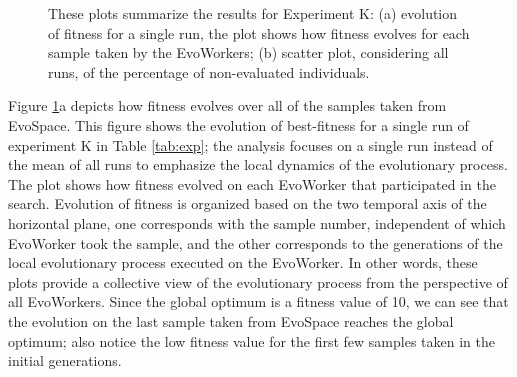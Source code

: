 \begin{figure}[t]
    \centering
    \caption{
    These plots summarize the results for Experiment K:
    (a) evolution of fitness for a single run, the plot shows how fitness evolves for each sample taken by the EvoWorkers;
    (b) scatter plot, considering all runs, of the percentage of non-evaluated individuals.}
    \label{fig:others}
\end{figure}

Figure \ref{fig:others}a depicts how fitness evolves over all of the samples taken from EvoSpace.
This figure shows the evolution of best-fitness for a single run of experiment K in Table \ref{tab:exp};
the analysis focuses on a single run instead of the mean of all runs to emphasize the local dynamics of the evolutionary process.
The plot shows how fitness evolved on each EvoWorker that participated in the search.
Evolution of fitness is organized based on the two temporal axis of the horizontal plane,
one corresponds with the sample number, independent of which EvoWorker took the sample, and the other corresponds
to the generations of the local evolutionary process executed on the EvoWorker.
In other words, these plots provide a collective view of the evolutionary process from the perspective of all EvoWorkers.
Since the global optimum is a fitness value of 10, we can see that the evolution on the last sample taken from EvoSpace reaches the global optimum;
also notice the low fitness value for the first few samples taken in the initial generations.

